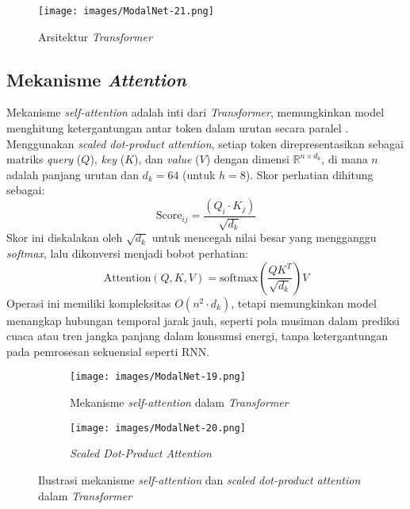 \begin{figure}[h]
    \centering
    \texttt{[image: images/ModalNet-21.png]}
    \caption{Arsitektur \textit{Transformer} \autocite{Vaswani2017}}
    \label{fig:transformer_architecture}
\end{figure}

\subsection{Mekanisme \textit{Attention}}
\label{sec:attention}



Mekanisme \textit{self-attention} adalah inti dari \textit{Transformer}, memungkinkan model menghitung ketergantungan antar token dalam urutan secara paralel \citep{Vaswani2017}. Menggunakan \textit{scaled dot-product attention}, setiap token direpresentasikan sebagai matriks \textit{query} (\( Q \)), \textit{key} (\( K \)), dan \textit{value} (\( V \)) dengan dimensi \( \mathbb{R}^{n \times d_k} \), di mana \( n \) adalah panjang urutan dan \( d_k = 64 \) (untuk \( h=8 \)). Skor perhatian dihitung sebagai:
\begin{equation}
\text{Score}_{ij} = \frac{(Q_i \cdot K_j)}{\sqrt{d_k}}
\end{equation}
Skor ini diskalakan oleh \( \sqrt{d_k} \) untuk mencegah nilai besar yang mengganggu \textit{softmax}, lalu dikonversi menjadi bobot perhatian:
\begin{equation}
\text{Attention}(Q, K, V) = \text{softmax}\left(\frac{QK^T}{\sqrt{d_k}}\right)V
\end{equation}
Operasi ini memiliki kompleksitas \( O(n^2 \cdot d_k) \), tetapi memungkinkan model menangkap hubungan temporal jarak jauh, seperti pola musiman dalam prediksi cuaca atau tren jangka panjang dalam konsumsi energi, tanpa ketergantungan pada pemrosesan sekuensial seperti RNN.
\begin{figure}[h]
    \centering
    \begin{subfigure}[t]{0.3\textwidth}
        \centering
        \texttt{[image: images/ModalNet-19.png]}
        \caption{Mekanisme \textit{self-attention} dalam \textit{Transformer}}
        \label{fig:self_attention_a}
    \end{subfigure}
    \hfill
    \begin{subfigure}[t]{0.3\textwidth}
        \centering
        \texttt{[image: images/ModalNet-20.png]}
        \caption{\textit{Scaled Dot-Product Attention}}
        \label{fig:self_attention_b}
    \end{subfigure}
    \caption{Ilustrasi mekanisme \textit{self-attention} dan \textit{scaled dot-product attention} dalam \textit{Transformer} \autocite{Vaswani2017}}
    \label{fig:self_attention_comparison}
\end{figure}
